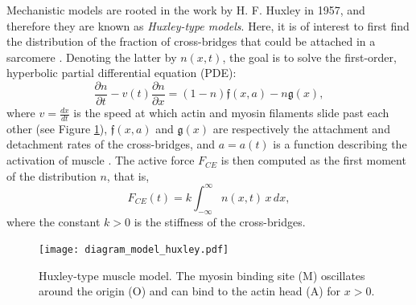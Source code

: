 \documentclass{sfuthesis}
\numberwithin{equation}{section}
\numberwithin{figure}{chapter}
\numberwithin{table}{chapter}
\theoremstyle{definition}
\newcommand{\pder}[2]{\dfrac{\partial #1}{\partial #2}}
\begin{document}
Mechanistic models are rooted in the work by H. F. Huxley \cite{Huxley1957} in 1957, and therefore they are known as \textit{Huxley-type models}. Here, it is of interest to first find the distribution of the fraction of cross-bridges that could be attached in a sarcomere \cite{GordonHuxleyJulian1966, Huxley1957}. Denoting the latter by $n(x,t)$, the goal is to solve the first-order, hyperbolic partial differential equation (PDE):
\[
 \pder{n}{t} - v(t) \pder{n}{x} = (1-n) \mathfrak{f}(x,a) - n \mathfrak{g}(x),
\]
where $v = \frac{dx}{dt}$ is the speed at which actin and myosin filaments slide past each other (see Figure \ref{fig:diagram_huxley}), $\mathfrak{f}(x,a)$ and $\mathfrak{g}(x)$ are respectively the attachment and detachment rates of the cross-bridges, and $a = a(t)$ is a function describing the activation of muscle \cite{Milicevic2022HuxleySurrogates}. The active force $F_{CE}$ is then computed as the first moment of the distribution $n$, that is,
\[
F_{CE}(t) = k \int_{-\infty}^\infty n(x,t) \, x \, dx,
\]
where the constant $k > 0$ is the stiffness of the cross-bridges. 

\begin{figure}
    \centering
    \texttt{[image: diagram\_model\_huxley.pdf]}
    \caption{Huxley-type muscle model. The myosin binding site (M) oscillates around the origin (O) and can bind to the actin head (A) for $x>0$.\label{fig:diagram_huxley}}
\end{figure}
\end{document}
